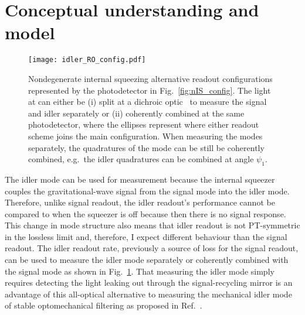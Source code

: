 \section{Conceptual understanding and model}
\label{sec:nIS_idlerRO_model}

\begin{figure}
    \centering
    \texttt{[image: idler\_RO\_config.pdf]}
    \caption{Nondegenerate internal squeezing alternative readout configurations represented by the photodetector in Fig.~\ref{fig:nIS_config}. The light at can either be (i) split at a dichroic optic~\cite{} to measure the signal and idler separately or (ii) coherently combined at the same photodetector, where the ellipses represent where either readout scheme joins the main configuration. When measuring the modes separately, the quadratures of the mode can be still be coherently combined, e.g.\ the idler quadratures can be combined at angle $\psi_1$.}
    \label{fig:idler_RO_config}
\end{figure}

The idler mode can be used for measurement because the internal squeezer couples the gravitational-wave signal from the signal mode into the idler mode. Therefore, unlike signal readout, the idler readout's performance cannot be compared to when the squeezer is off because then there is no signal response. This change in mode structure also means that idler readout is not PT-symmetric in the lossless limit  and, therefore, I expect different behaviour than the signal readout. The idler readout rate, previously a source of loss for the signal readout, can be used to measure the idler mode separately or coherently combined with the signal mode as shown in Fig.~\ref{fig:idler_RO_config}. That measuring the idler mode simply requires detecting the light leaking out through the signal-recycling mirror is an advantage of this all-optical alternative to measuring the mechanical idler mode of stable optomechanical filtering as proposed in Ref.~\cite{liEnhancingInterferometerSensitivity2021}.


